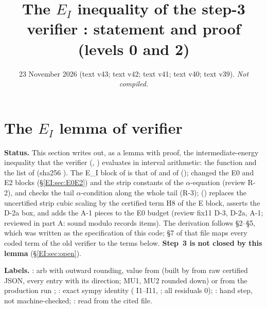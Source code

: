 \documentclass[11pt]{article}
\title{The $E_I$ inequality of the step-3 verifier \fn{fin13v4c}: statement and proof (levels 0 and 2)}
\author{}\date{23 November 2026 (text v43; text v42; text v41; text v40; text v39). \emph{Not compiled.}}
\begin{document}
\maketitle
\fi
\providecommand{\Dv}{\mathcal D_V}

\section{The $E_I$ lemma of verifier }\label{EI:sec}
\noindent\textbf{Status.} This section writes out, as a lemma with proof, the intermediate-energy inequality that the verifier  (, ) evaluates in interval arithmetic: the function  and the list  of  (sha256 ). The E\_I block of  is that of  and of  ();  changed the E0 and E2 blocks (\S\ref{EI:sec:E0E2}) and the strip constants of the $\alpha$-equation (review R-2), and checks the tail $\alpha$-condition along the whole tail (R-3);  () replaces the uncertified strip cubic scaling  by the certified term H8 of the E block, asserts the D-2a box, and adds the A-1 pieces to the E0 budget (review fix11 D-3, D-2a, A-1; reviewed in  part A: sound modulo records items). The derivation follows  \S2--\S5, which was written as the specification of this code; \S7 of that file maps every coded term of the old verifier  to the terms below. \textbf{Step~3 is not closed by this lemma} (\S\ref{EI:sec:open}).

\noindent\textbf{Labels.} \tC: arb with outward rounding, value from  (built by  from raw certified JSON, every entry with its direction; MU1, MU2 rounded down) or from the production run ; \tS: exact sympy identity ( I1--I11, ; all residuals 0); \tHd: hand step, not machine-checked; \tR: read from the cited file.
\end{document}
